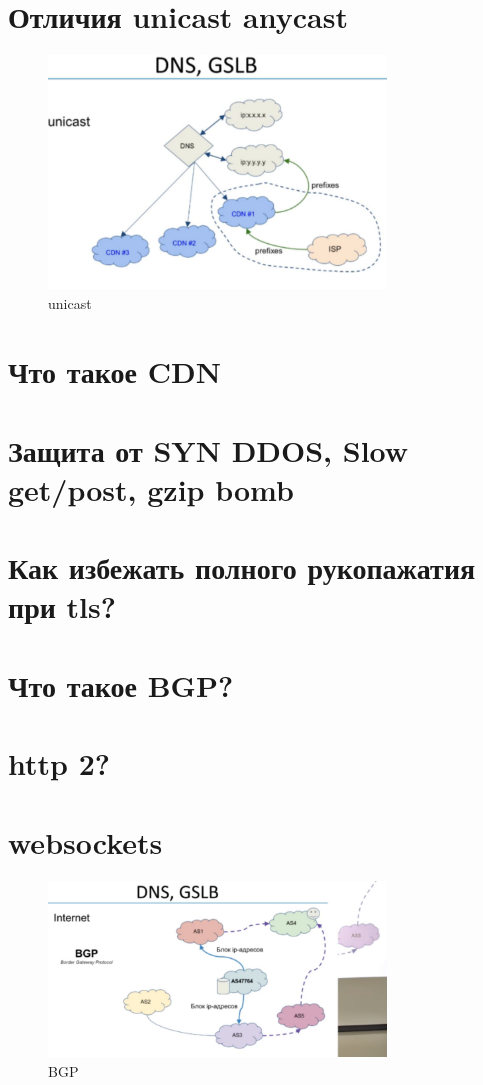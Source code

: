\section{Отличия unicast anycast}

\begin{figure}[h!]
\centering
\includegraphics[width=0.8\textwidth]{img/unicast.png}
\caption{unicast}
\label{unicast}
\end{figure}

\section{Что такое CDN}

\section{Защита от SYN DDOS, Slow get/post, gzip bomb}

\section{Как избежать полного рукопажатия при tls?}

\section{Что такое BGP?}

\section{http 2?}

\section{websockets}

\begin{figure}[h!]
\centering
\includegraphics[width=0.8\textwidth]{img/BGP.png}
\caption{BGP}
\label{BGP}
\end{figure}

